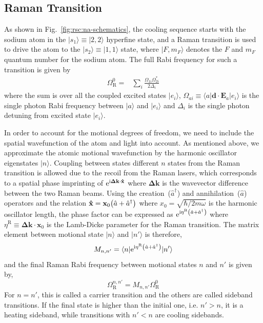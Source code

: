 \subsection{Raman Transition}
\label{ch:rsc:basic-theory:raman}

As shown in Fig.~\ref{fig:rsc:na-schematics},
the cooling sequence starts with the sodium atom in the
$|s_1\rangle\equiv|2,2\rangle$ hyperfine state,
and a Raman transition is used to drive the atom to the $|s_2\rangle\equiv|1,1\rangle$ state,
where $|F,m_F\rangle$ denotes the $F$ and $m_F$ quantum number for the sodium atom.
The full Rabi frequency for such a transition is given by~\cite{knight_quantum_2003}
\begin{align}
  \Omega_{\mathrm{R}}^0=&\sum_{i}\frac{\Omega_{1i}\Omega_{2i}^*}{2\Delta_i}\label{eq:rsc:basic-theory:raman-rabi}
\end{align}
where the sum is over all the coupled excited states $|e_i\rangle$,
$\Omega_{ai}\equiv\langle a|\mathbf{d}\cdot\mathbf{E}_a|e_i\rangle$ is the single photon
Rabi frequency between $|a\rangle$ and $|e_i\rangle$
and $\Delta_i$ is the single photon detuning from excited state $|e_i\rangle$.

In order to account for the motional degrees of freedom, we need to include the spatial
wavefunction of the atom and light into account.
As mentioned above, we approximate the atomic motional wavefunction by the harmonic oscillator
eigenstates $|n\rangle$. Coupling between states different $n$ states from the Raman transition
is allowed due to the recoil from the Raman lasers,
which corresponds to a spatial phase imprinting of $\mathrm{e}^{\mathrm{i}\mathbf{\Delta k}\cdot\mathbf{\hat x}}$
where $\mathbf{\Delta k}$ is the wavevector difference between the two Raman beams.
Using the creation~($\hat a^\dagger$) and annihilation~($\hat a$) operators and the relation
$\mathbf{\hat x}=\mathbf{x}_0{\left({\hat a+\hat a^\dagger}\right)}$ where $x_0=\sqrt{\hbar/2m\omega}$
is the harmonic oscillator length, the phase factor can be expressed as
$\mathrm{e}^{\mathrm{i}\eta^{\mathrm{R}}{\left({\hat a+\hat a^\dagger}\right)}}$ where $\eta^{\mathrm{R}}\equiv\mathbf{\Delta k}\cdot\mathbf{x}_0$
is the Lamb-Dicke parameter for the Raman transition.
The matrix element between motional state $|n\rangle$ and $|n'\rangle$ is therefore,
\[ M_{n,n'}=\langle n|\mathrm{e}^{\mathrm{i}\eta^{\mathrm{R}}{\left({\hat a+\hat a^\dagger}\right)}}|n'\rangle \]
and the final Raman Rabi frequency between motional states $n$ and $n'$ is given by,
\[ \Omega_{\mathrm{R}}^{n,n'}=M_{n,n'}\Omega_{\mathrm{R}}^0 \]
For $n=n'$, this is called a carrier transition and the others are called sideband transitions.
If the final state is higher than the initial one, i.e. $n'>n$, it is a heating sideband,
while transitions with $n'<n$ are cooling sidebands.

